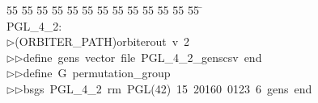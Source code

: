 %
%
\begin{tabbing}
55 \= 55 \= 55 \= 55 \= 55 \= 55 \= 55 \= 55 \= 55 \= 55 \= 55 \= 55 \= 55 \= \kill
\\[0pt]
PGL\_4\_2:\\[0pt]
$\triangleright$\>(ORBITER\_PATH)orbiterout\ v\ 2\ \\[0pt]
$\triangleright$\>$\triangleright$\>define\ gens\ vector\ file\ PGL\_4\_2\_genscsv\ end\ \\[0pt]
$\triangleright$\>$\triangleright$\>define\ G\ permutation\_group\ \\[0pt]
$\triangleright$\>$\triangleright$\>bsgs\ PGL\_4\_2\ rm\ PGL(42)\ 15\ 20160\ 0123\ 6\ gens\ end\ \\[0pt]
\end{tabbing}
